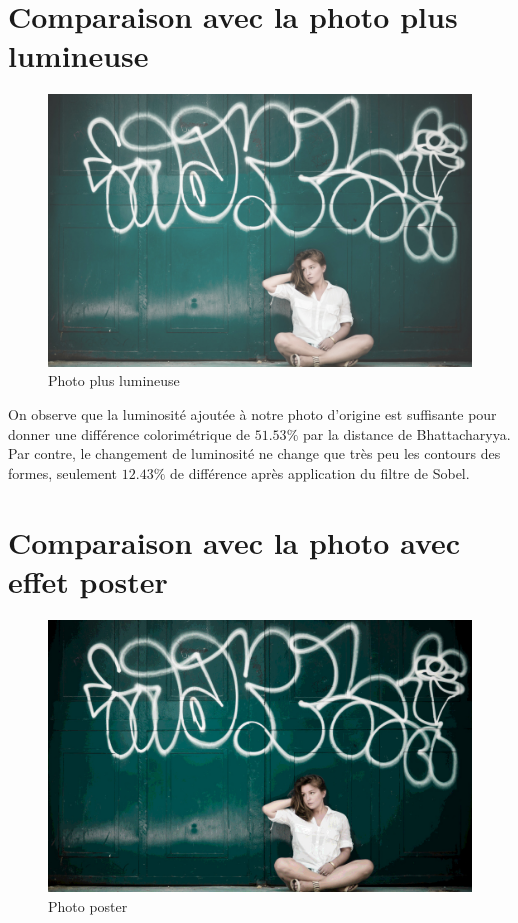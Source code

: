 \documentclass[]{article}
\begin{document}
\newpage

\section{Comparaison avec la photo plus
lumineuse}\label{comparaison-avec-la-photo-plus-lumineuse}

\begin{figure}[htbp]
\centering
\includegraphics{photos/lumineux.jpg}
\caption{Photo plus lumineuse}
\end{figure}

On observe que la luminosité ajoutée à notre photo d'origine est
suffisante pour donner une différence colorimétrique de $51.53\%$ par la
distance de Bhattacharyya. Par contre, le changement de luminosité ne
change que très peu les contours des formes, seulement $12.43\%$ de
différence après application du filtre de Sobel.

\newpage

\section{Comparaison avec la photo avec effet
poster}\label{comparaison-avec-la-photo-avec-effet-poster}

\begin{figure}[htbp]
\centering
\includegraphics{photos/poster.jpg}
\caption{Photo poster}
\end{figure}
\end{document}
